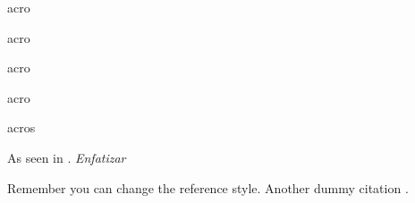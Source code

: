 \ac{acro} 

\acf{acro}

\acs{acro}

\acl{acro}

\acp{acro}

As seen in \cite{wiki}. \emph{Enfatizar}


Remember you can change the reference style. Another dummy citation \cite{site}.